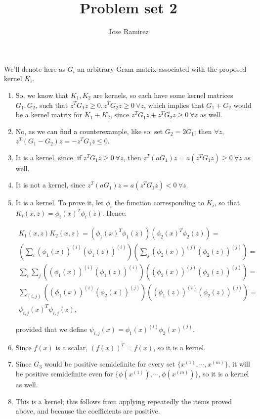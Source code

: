 \documentclass{article}
\title{Problem set 2}
\author{Jose Ramirez}
\begin{document}
\maketitle

We'll denote here as $G_i$ an arbitrary Gram matrix associated with the proposed kernel $K_i$.
\begin{enumerate}

\item So, we know that $K_1, K_2$ are kernels, so each have some kernel matrices $G_1, G_2$, such that $z^TG_1z \geq 0, z^TG_2z \geq 0  \ \forall z$, which implies that $G_1 + G_2$ would be a kernel matrix for $K_1 + K_2$, since $z^TG_1z + z^TG_2z \geq 0\ \forall z$ as well.

\item No, as we can find a counterexample, like so: set $G_2 = 2G_1$; then $\forall z$, $z^T(G_1 - G_2)z = -z^TG_1z \leq 0$.

\item It is a kernel, since, if $z^TG_1z  \geq 0 \ \forall z$, then $z^T(aG_1)z = a(z^TG_1z) \geq 0 \ \forall z$ as well.

\item It is not a kernel, since $z^T(aG_1)z = a(z^TG_1z) < 0 \ \forall z$.

\item It is a kernel. To prove it, let $\phi_i$ the function corresponding to $K_i$, so that $K_i(x, z) = \phi_{i}(x)^T\phi_{i}(z)$.
Hence:

\begin{align*}
	K_1(x, z)K_2(x, z) = \left(\phi_1(x)^T\phi_1(z)\right)\left(\phi_{2}(x)^T\phi_{2}(z)\right) = \\
	\left(\sum_i (\phi_1(x))^{(i)}(\phi_1(z))^{(i)}\right) \left(\sum_j (\phi_{2}(x))^{(j)}(\phi_{2}(z))^{(j)}\right) = \\
	\sum_i \sum_j \left((\phi_1(x))^{(i)}(\phi_1(z))^{(i)}\right) \left((\phi_{2}(x))^{(j)}(\phi_{2}(z))^{(j)}\right) = \\
	\sum_{(i, j)} \left((\phi_1(x))^{(i)}(\phi_2(x))^{(j)}\right)\left((\phi_{1}(z))^{(i)}(\phi_{2}(z))^{(j)}\right) = \\
	\psi_{i,j}(x)^T\psi_{i,j}(z),
\end{align*}

provided that we define $\psi_{i,j}(x) = \phi_1(x)^{(i)}\phi_2(x)^{(j)}$.

\item Since $f(x)$ is a scalar, $(f(x))^T = f(x)$, so it is a kernel.

\item Since $G_3$ would be positive semidefinite for every set $\{x^{(1)}, \cdots, x^{(m)}\}$, it will be positive semidefinite even for $\{\phi(x^{(1)}), \cdots, \phi(x^{(m)})\}$, so it is a kernel as well.

\item This is a kernel; this follows from applying repeatedly the items proved above, and because the coefficients are positive.

\end{enumerate}
\end{document}
